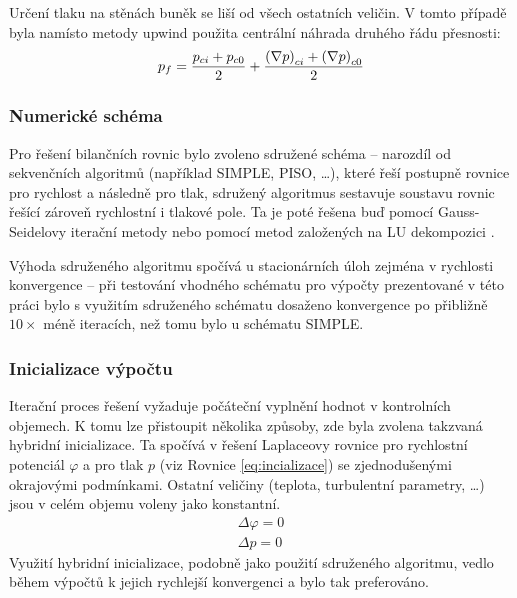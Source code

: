             Určení tlaku na stěnách buněk se liší od všech ostatních veličin. V tomto případě byla namísto metody upwind použita centrální náhrada druhého řádu přesnosti:
            \begin{equation}
                p _{f} = \frac{p_{ci} + p _{c0}}{2} + \frac{\left( \nabla p \right) _{ci} + \left( \nabla p \right) _{c0}}{2}
            \end{equation}
        \subsubsection{Numerické schéma}
            Pro řešení bilančních rovnic bylo zvoleno sdružené schéma – narozdíl od sekvenčních algoritmů (například SIMPLE, PISO, \dots), které řeší postupně rovnice pro rychlost a následně pro tlak, sdružený algoritmus sestavuje soustavu rovnic řešící zároveň rychlostní i tlakové pole. Ta je poté řešena buď pomocí Gauss-Seidelovy iterační metody nebo pomocí metod založených na LU dekompozici \cite{Ansys2020Theory}.

            Výhoda sdruženého algoritmu spočívá u stacionárních úloh zejména v rychlosti konvergence \cite{Ansys2020User} – při testování vhodného schématu pro výpočty prezentované v této práci bylo s využitím sdruženého schématu dosaženo konvergence po přibližně $10\times$ méně iteracích, než tomu bylo u schématu SIMPLE.
        \subsubsection{Inicializace výpočtu}
            Iterační proces řešení vyžaduje počáteční vyplnění hodnot v kontrolních objemech. K tomu lze přistoupit několika způsoby, zde byla zvolena takzvaná hybridní inicializace. Ta spočívá v řešení Laplaceovy rovnice pro rychlostní potenciál $\varphi$ a pro tlak $p$ (viz Rovnice \ref{eq:incializace}) se zjednodušenými okrajovými podmínkami. Ostatní veličiny (teplota, turbulentní parametry, \dots) jsou v celém objemu voleny jako konstantní. 
            \begin{equation} \label{eq:incializace}
                \begin{split}
                    \Delta \varphi = 0 \\
                    \Delta p = 0
                \end{split}
            \end{equation}
            Využití hybridní inicializace, podobně jako použití sdruženého algoritmu, vedlo během výpočtů k jejich rychlejší konvergenci a bylo tak preferováno.
